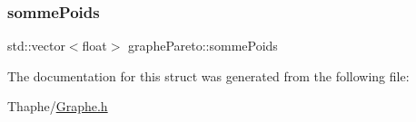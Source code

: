 \subsubsection{\texorpdfstring{sommePoids}{sommePoids}}
{\footnotesize\ttfamily std\+::vector$<$float$>$ graphe\+Pareto\+::somme\+Poids}



The documentation for this struct was generated from the following file\+:\begin{DoxyCompactItemize}
\item 
Thaphe/\mbox{\hyperlink{_graphe_8h}{Graphe.\+h}}\end{DoxyCompactItemize}
